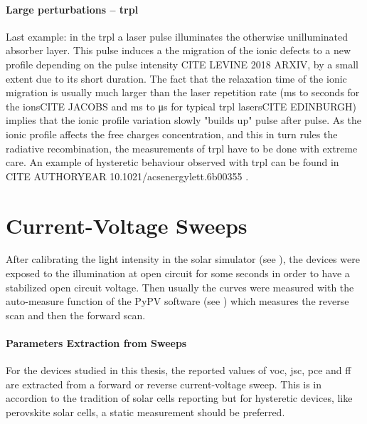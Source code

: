 \paragraph{Large perturbations -- \gls{trpl}} Last example: in the \glsdesc{trpl} a laser pulse illuminates the otherwise unilluminated absorber layer. This pulse induces a the migration of the ionic defects to a new profile depending on the pulse intensity CITE LEVINE 2018 ARXIV, by a small extent due to its short duration. The fact that the relaxation time of the ionic migration is usually much larger than the laser repetition rate (\si{\ms} to seconds for the ionsCITE JACOBS and \si{\ms} to \si{\us} for typical \gls{trpl} lasersCITE EDINBURGH) implies that the ionic profile variation slowly "builds up" pulse after pulse. As the ionic profile affects the free charges concentration, and this in turn rules the radiative recombination, the measurements of \gls{trpl} have to be done with extreme care. An example of hysteretic behaviour observed with \gls{trpl} can be found in CITE AUTHORYEAR 10.1021/acsenergylett.6b00355 .


\section{Current-Voltage Sweeps}

After calibrating the light intensity in the solar simulator (see ), the devices were exposed to the illumination at open circuit for some seconds in order to have a stabilized open circuit voltage. Then usually the curves were measured with the auto-measure function of the PyPV software (see ) which measures the reverse scan and then the forward scan.

\paragraph{Parameters Extraction from Sweeps}
For the devices studied in this thesis, the reported values of \gls{voc}, \gls{jsc}, \gls{pce} and \gls{ff} are extracted from a forward or reverse current-voltage sweep. This is in accordion to the tradition of solar cells reporting but for hysteretic devices, like perovskite solar cells, a static measurement should be preferred. %

